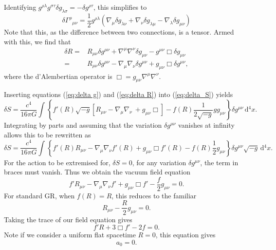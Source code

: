 \documentclass[a4paper, 11pt, titlepage, twoside]{report}
\newcommand{\dd}{\ensuremath{\mathrm{d}}}
\newcommand{\intd}[4]{\ensuremath{\int_{#1}^{#2}{#3}\,\dd{#4}}}
\begin{document}
Identifying $g^{\rho\lambda}g^{\sigma\tau}\delta g_{\lambda\sigma} = -\delta g^{\rho\tau}$, this simplifies to
\begin{equation}
\delta {\Gamma^\rho}_{\mu\nu} = \frac{1}{2}g^{\rho\lambda}\left(\nabla_\mu \delta g_{\lambda\nu} + \nabla_\nu \delta g_{\lambda\mu} - \nabla_\lambda \delta g_{\mu\nu}\right)
\end{equation}
Note that this, as the difference between two connections, is a tensor. Armed with this, we find that
\begin{align}
\delta R = {} & R_{\mu\nu}\delta g^{\mu\nu} + \nabla^\mu\nabla^\nu\delta g_{\mu\nu} - g^{\mu\nu}\Box\delta g_{\mu\nu} \nonumber \\
 = {} & R_{\mu\nu}\delta g^{\mu\nu} - \nabla_\mu\nabla_\nu\delta g^{\mu\nu} + g_{\mu\nu}\Box\delta g^{\mu\nu},
\label{eq:delta R}
\end{align}
where the d'Alembertian operator is $\Box = g_{\mu\nu}\nabla^\mu\nabla^\nu$.

Inserting equations (\ref{eq:delta g}) and (\ref{eq:delta R}) into (\ref{eq:delta_S}) yields
\begin{equation}
\delta S = \frac{c^4}{16\pi G}\intd{}{}{\left\{f'(R)\sqrt{-g}\left[R_{\mu\nu} - \nabla_\mu\nabla_\nu\ + g_{\mu\nu}\Box\right] - f(R)\frac{1}{2\sqrt{-g}}gg_{\mu\nu}\right\}\delta g^{\mu\nu}}{^4x}.
\end{equation}
Integrating by parts and assuming that the variation $\delta g^{\mu\nu}$ vanishes at infinity allows this to be rewritten as
\begin{equation}
\delta S = \frac{c^4}{16\pi G}\intd{}{}{\left\{f'(R)R_{\mu\nu} - \nabla_\mu\nabla_\nu f'(R) + g_{\mu\nu}\Box f'(R) - f(R)\frac{1}{2}g_{\mu\nu}\right\}\delta g^{\mu\nu}\sqrt{-g}}{^4x}.
\end{equation}
For the action to be extremised for, $\delta S = 0$, for any variation $\delta g^{\mu\nu}$, the term in braces must vanish. Thus we obtain the vacuum field equation
\begin{equation}
f'R_{\mu\nu} - \nabla_\mu\nabla_\nu f' + g_{\mu\nu}\Box f' - \frac{f}{2}g_{\mu\nu} = 0.
\label{eq:Field_eq}
\end{equation}
For standard GR, when $f(R) = R$, this reduces to the familiar
\begin{equation}
R_{\mu\nu} - \frac{R}{2}g_{\mu\nu} = 0.
\end{equation}
Taking the trace of our field equation gives
\begin{equation}
f'R + 3\Box f' - 2f = 0.
\label{eq:Trace_eq}
\end{equation}
Note if we consider a uniform flat spacetime $R = 0$, this equation gives
\begin{equation}
a_0 = 0.
\label{eq:a_0}
\end{equation}
\end{document}
